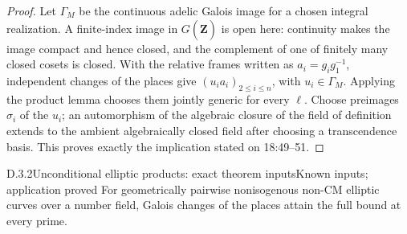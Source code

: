 \begin{proof}
Let \(\Gamma_M\) be the continuous adelic Galois image for a chosen
integral realization. A finite-index image in
\(G(\widehat{\mathbf Z})\) is open here: continuity makes the image
compact and hence closed, and the complement of one of finitely many
closed cosets is closed. With the relative frames written as
\(a_i=g_i g_1^{-1}\), independent changes of the places give
\((u_i a_i)_{2\le i\le n}\), with \(u_i\in\Gamma_M\). Applying
the product lemma chooses them jointly generic for every \(\ell\).
Choose preimages \(\sigma_i\) of the \(u_i\); an automorphism of
the algebraic closure of the field of definition extends to the
ambient algebraically closed field after choosing a transcendence
basis. This proves exactly the implication stated on 18:49--51.
\end{proof}

\begin{result}{D.3.2}{Unconditional elliptic products: exact theorem inputs}{Known inputs; application proved}
For geometrically pairwise nonisogenous non-CM elliptic curves over a number field, Galois changes of the places attain the full bound at every prime.
\end{result}
